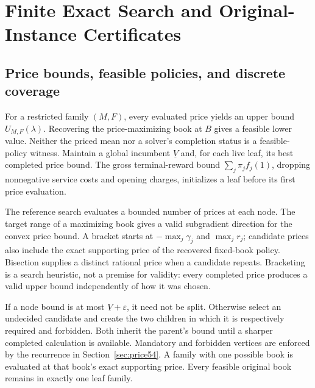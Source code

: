 \documentclass[11pt,letterpaper]{article}
\theoremstyle{definition}\newtheorem{remark}[theorem]{Remark}
\begin{document}
\section{Finite Exact Search and Original-Instance Certificates}\label{sec:branch54}
\subsection{Price bounds, feasible policies, and discrete coverage}
For a restricted family $(M,F)$, every evaluated price yields an upper bound $U_{M,F}(\lambda)$. Recovering the price-maximizing book at $B$ gives a feasible lower value. Neither the priced mean nor a solver's completion status is a feasible-policy witness. Maintain a global incumbent $\underline V$ and, for each live leaf, its best completed price bound. The gross terminal-reward bound $\sum_j\pi_jf_j(1)$, dropping nonnegative service costs and opening charges, initializes a leaf before its first price evaluation.

The reference search evaluates a bounded number of prices at each node. The target range of a maximizing book gives a valid subgradient direction for the convex price bound. A bracket starts at $-\max_j\gamma_j$ and $\max_jr_j$; candidate prices also include the exact supporting price of the recovered fixed-book policy. Bisection supplies a distinct rational price when a candidate repeats. Bracketing is a search heuristic, not a premise for validity: every completed price produces a valid upper bound independently of how it was chosen.

If a node bound is at most $\underline V+\varepsilon$, it need not be split. Otherwise select an undecided candidate and create the two children in which it is respectively required and forbidden. Both inherit the parent's bound until a sharper completed calculation is available. Mandatory and forbidden vertices are enforced by the recurrence in Section~\ref{sec:price54}. A family with one possible book is evaluated at that book's exact supporting price. Every feasible original book remains in exactly one leaf family.
\end{document}
